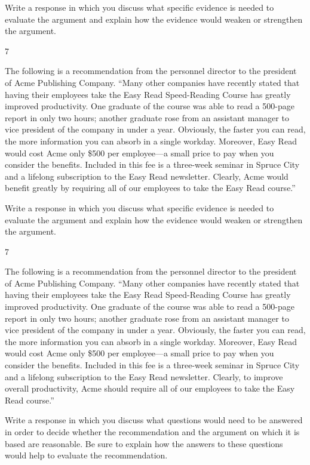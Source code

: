 \documentclass[]{article}
\begin{document}
Write a response in which you discuss what specific evidence is needed
to evaluate the argument and explain how the evidence would weaken or
strengthen the argument.

7

The following is a recommendation from the personnel director to the
president of Acme Publishing Company. ``Many other companies have
recently stated that having their employees take the Easy Read
Speed-Reading Course has greatly improved productivity. One graduate of
the course was able to read a 500-page report in only two hours; another
graduate rose from an assistant manager to vice president of the company
in under a year. Obviously, the faster you can read, the more
information you can absorb in a single workday. Moreover, Easy Read
would cost Acme only \$500 per employee---a small price to pay when you
consider the benefits. Included in this fee is a three-week seminar in
Spruce City and a lifelong subscription to the Easy Read newsletter.
Clearly, Acme would benefit greatly by requiring all of our employees to
take the Easy Read course.''

Write a response in which you discuss what specific evidence is needed
to evaluate the argument and explain how the evidence would weaken or
strengthen the argument.

7

The following is a recommendation from the personnel director to the
president of Acme Publishing Company. ``Many other companies have
recently stated that having their employees take the Easy Read
Speed-Reading Course has greatly improved productivity. One graduate of
the course was able to read a 500-page report in only two hours; another
graduate rose from an assistant manager to vice president of the company
in under a year. Obviously, the faster you can read, the more
information you can absorb in a single workday. Moreover, Easy Read
would cost Acme only \$500 per employee---a small price to pay when you
consider the benefits. Included in this fee is a three-week seminar in
Spruce City and a lifelong subscription to the Easy Read newsletter.
Clearly, to improve overall productivity, Acme should require all of our
employees to take the Easy Read course.''

Write a response in which you discuss what questions would need to be
answered in order to decide whether the recommendation and the argument
on which it is based are reasonable. Be sure to explain how the answers
to these questions would help to evaluate the recommendation.
\end{document}
